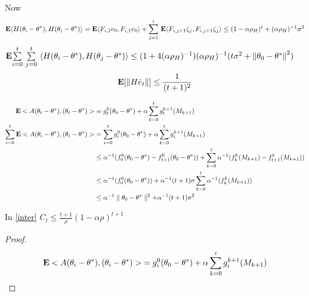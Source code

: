 Now
\begin{align*}
\E\ip{H(\theta_i-\theta^*),H(\theta_i-\theta^*)}=\E\ip{F_{i,1}e_0,F_{i,1}e_0}+\ous{\sum}{j=1}{i}\E\ip{F_{i,j+1}\zeta_j,F_{i,j+1}\zeta_j}
\leq (1-\alpha\rho_H)^i+ (\alpha\rho_H)^{-1}\sigma^2
\end{align*}
$\E\ous{\sum}{i=0}{t}\ous{\sum}{j=0}{t}\ip{H(\theta_i-\theta^*),H(\theta_j-\theta^*)}\leq (1+4(\alpha\rho_H)^{-1}) (\alpha\rho_H)^{-1}(t\sigma^2+\norm{\theta_0-\ts}^2)$
\begin{align}
\E[\norm{H\eb_t}]\leq \frac{1}{(t+1)^2}
\end{align}


\begin{align*}
\E<A(\theta_t-\theta^*),(\theta_t-\theta^*)>&=g^0_t(\theta_0-\theta^*)+\alpha\sum_{k=0}^t g^{k+1}_t(M_{k+1})\\
\sum_{i=0}^t\E<A(\theta_i-\theta^*),(\theta_i-\theta^*)>&=\sum_{i=0}^t g^0_i(\theta_0-\theta^*)+\alpha\sum_{k=0}^t g^{k+1}_i(M_{k+1})\\
&\leq\alpha^{-1}(f^0_0(\theta_0-\ts)-f^0_{t+1}(\theta_0-\ts))+\sum_{k=0}^t \alpha^{-1}(f^k_k(M_{k+1})-f^k_{t+1}(M_{k+1}))\\
&\leq\alpha^{-1}(f^0_0(\theta_0-\ts))+\alpha^{-1}(t+1)\sigma\sum_{k=0}^t \alpha^{-1}(f^k_k(M_{k+1}))\\
&\leq\alpha^{-1}\parallel \theta_0-\ts\parallel^2+\alpha^{-1}(t+1)\sigma^2
\end{align*}
\begin{lemma}
In \eqref{inter} $C_t\leq \frac{t+1}{\rho}{(1-\alpha\rho)^{t+1}}$
\end{lemma}
\begin{proof}
\begin{align*}
\E<A(\theta_i-\theta^*),(\theta_i-\theta^*)>&=g^0_i(\theta_0-\theta^*)+\alpha\sum_{k=0}^i g^{k+1}_i(M_{k+1})\\
\end{align*}
\end{proof}
